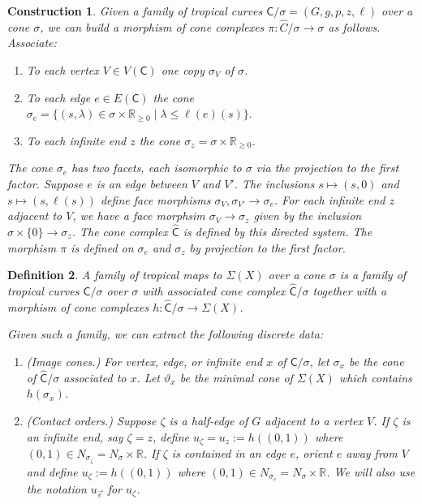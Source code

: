 \documentclass{article}
\newtheorem{definition}{Definition}[section]
\newtheorem{construction}[definition]{Construction}
\newcommand{\tropC}{\mathsf{C}}
\begin{document}
    \begin{construction}\cite[Construction 2.20]{ACGSI} \label{const: tropCspace}
        Given a family of tropical curves $\tropC/\sigma = (G, g, p, z, \ell)$ over a cone $\sigma$, we can build a morphism of cone complexes $\pi: \hat{C}/ \sigma \rightarrow \sigma$ as follows. Associate:
        \begin{enumerate}
            \item To each vertex $V \in V(\tropC)$ one copy $\sigma_V$ of $\sigma$. 
            \item To each edge $e \in E(\tropC)$ the cone
            $\sigma_e = \{(s, \lambda) \in \sigma \times \mathbb{R}_{\geq 0} \mid \lambda \leq \ell(e)(s)\}.$
            \item To each infinite end $z$ the cone $\sigma_{z} = \sigma \times \mathbb{R}_{\geq 0}$.
        \end{enumerate}
        The cone $\sigma_e$ has two facets, each isomorphic to $\sigma$ via the projection to the first factor. Suppose $e$ is an edge between $V$ and $V'$. The inclusions $s \mapsto (s,0)$ and $s \mapsto (s, \ell(s))$ define face morphisms $\sigma_{V}, \sigma_{V'} \rightarrow \sigma_e $. For each infinite end $z$ adjacent to $V$, we have a face morphsim $\sigma_V \rightarrow \sigma_{z}$ given by the inclusion $\sigma \times \{0 \} \rightarrow \sigma_{z}$. The cone complex $\hat{\tropC}$ is defined by this directed system. The morphism $\pi$ is defined on $\sigma_{e}$ and $\sigma_{z}$ by projection to the first factor. 
    \end{construction}



    \begin{definition}\label{def: family of trop maps to Sigma}\cite[Definition 2.21]{ACGSI}
        A family of tropical maps to $\Sigma(X)$ over a cone $\sigma$ is a family of tropical curves $\tropC/\sigma$ over $\sigma$ with associated cone complex $\hat{\tropC}/\sigma$ together with a morphism of cone complexes $h: \hat{\tropC}/\sigma \rightarrow \Sigma(X)$. 
    

    
    Given such a family, we can extract the following discrete data: 
    \begin{enumerate}
        \item (Image cones.) For vertex, edge, or infinite end $x$ of $\tropC/\sigma$, let $\sigma_x$ be the cone of $\hat{\tropC}/\sigma$ associated to $x$. Let $\vartheta_x$ be the minimal cone of $\Sigma(X)$ which contains $h(\sigma_x)$. 
        \item (Contact orders.) Suppose $\zeta$ is a half-edge of $G$ adjacent to a vertex $V$. If $\zeta$ is an infinite end, say $\zeta=z$, define $u_{\zeta}= u_{z} := h((0,1))$ where $ (0,1) \in N_{\sigma_\zeta} = N_\sigma \times \mathbb{R}$. If $\zeta$ is contained in an edge $e$, orient $e$ away from $V$ and define $u_{\zeta} := h((0,1))$ where $ (0,1) \in N_{\sigma_e} = N_\sigma \times \mathbb{R}$. We will also use the notation $u_{\vec{e}}$ for $u_{\zeta}$.
    \end{enumerate}

    \end{definition}
\end{document}
